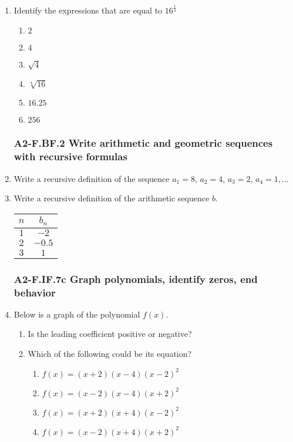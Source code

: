 \documentclass[12pt, twoside]{article}
\begin{document}
\begin{enumerate}[itemsep=0.5cm]
\item Identify the expressions that are equal to $\displaystyle 16^{\frac{1}{4}}$
    \begin{multicols}{2}
    \begin{enumerate}
        \item $2$        
        \item $4$        
        \item $\sqrt{4}$
        \item $\sqrt[4]{16}$
        \item $16.25$
        \item $256$
    \end{enumerate}
    \end{multicols}
        
 
\subsubsection*{A2-F.BF.2 Write arithmetic and geometric sequences with recursive formulas}
\item Write a recursive definition of the sequence $a_1 = 8$, $a_2 = 4$, $a_3 = 2$, $a_4 = 1, \ldots$ \vspace{2cm}

\item Write a recursive definition of the arithmetic sequence $b$. \\[0.5cm]
\renewcommand{\arraystretch}{1.5}
\begin{tabular}{|c|c|}
\hline
$n$ & $b_n$ \\
\hline
$1$ & $-2$ \\
$2$ & $-0.5$ \\
$3$ & $1$ \\
\hline
\end{tabular} \vspace{1cm}

\newpage 
\subsubsection*{A2-F.IF.7c Graph polynomials, identify zeros, end behavior}
\item Below is a graph of the polynomial $f(x)$. 
\begin{multicols}{2}
    \begin{enumerate}[itemsep=1cm]
        \item Is the leading coefficient positive or negative?
        \item Which of the following could be its equation?
    \begin{enumerate}
        \item $f(x)=(x+2)(x-4)(x-2)^2$
        \item $f(x)=(x-2)(x-4)(x+2)^2$
        \item $f(x)=(x+2)(x+4)(x-2)^2$
        \item $f(x)=(x-2)(x+4)(x+2)^2$
    \end{enumerate} \vspace{1cm} \;
    \end{enumerate}


\end{multicols}
\end{enumerate}
\end{document}
